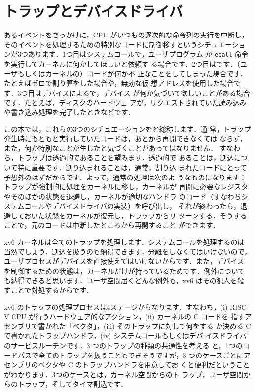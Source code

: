 \chapter{トラップとデバイスドライバ}
\label{CH:TRAP}

あるイベントをきっかけに，CPU がいつもの逐次的な命令列の実行を中断し，
そのイベントを処理するための特別なコードに制御移すというシチュエーショ
ンが3つあります．1つ目はシステムコールで，ユーザプログラム
が \texttt{ecall} 命令を実行してカーネルに何かしてほしいと依頼す
る場合です．2つ目はです．（ユーザもしくはカーネルの）コードが何か不
正なことをしてしまった場合です．たとえばゼロで割り算をした場合や，無効な仮
想アドレスを使用した場合です．3つ目はデバイスによるで，デバイス
が何か気づいて欲しいことがある場合です．たとえば，ディスクのハードウェ
アが，リクエストされていた読み込みや書き込み処理を完了したときなどです．

この本では，これらの3つのシチュエーションをと総称します．通
常，トラップ発生時にもともと実行していたコードは，あとから再開できなくては
ならず，また，何か特別なことが生じたと気づくことがあってはなりません．
すなわち，トラップは透過的であることを望みます．透過的で
あることは，割込について特に重要です．割り込まれることは，通常，割り込
まれたコードにとって予想外のはずだからです．よって，通常の処理は次のよ
うなものになります：トラップが強制的に処理をカーネルに移し，カーネルが
再開に必要なレジスタやそのほかの状態を退避し，カーネルが適切なハンドラ
のコード（すなわちシステムコールやデバイスドライバの実装）を呼び出し，
それが終わったら，退避しておいた状態をカーネルが復元し，トラップからリ
ターンする．そうすることで，元のコードは中断したところから再開すること
ができます．

xv6 カーネルは全てのトラップを処理します．システムコールを処理するのは
当然でしょう．割込を扱うのも納得できます．分離をしなくてはいけないので，
ユーザプロセスがデバイスを直接使えてはいけないからです．また，デバイス
を制御するための状態は，カーネルだけが持っているためです．例外について
も納得できると思います．ユーザ空間届くどんな例外も，xv6 はその犯人を殺
すことで対処するからです．

xv6 のトラップの処理プロセスは4ステージからなります．すなわち，(i)
RISC-V CPU が行うハードウェア的なアクション，(ii) カーネルの C コードを
指すアセンブリで書かれた「ベクタ」，(iii) そのトラップに対して何をする
か決める C で書かれたトラップハンドラ，(iv) システムコールもしくはデバ
イスドライバのサービスルーチンです．3 つのトラップの種類の共通性を考える
と，1つのコードパスで全てのトラップを扱うこともできそうですが，3
つのケースごとにアセンブリのベクタや C のトラップハンドラを用意してお
くと便利だということがわかります．3つのケースとは，カーネル空間からのト
ラップ，ユーザ空間からのトラップ，そしてタイマ割込です．

